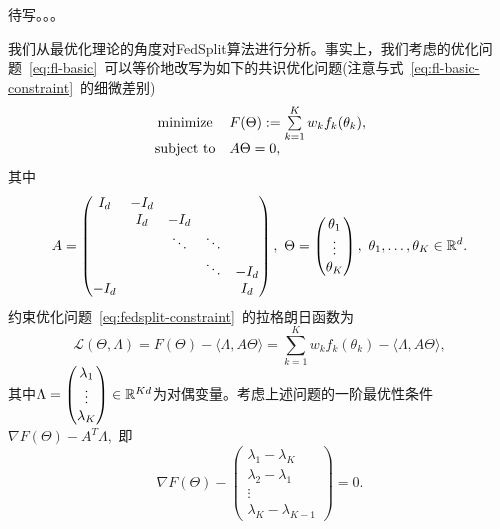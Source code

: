 待写。。。




我们从最优化理论的角度对FedSplit算法进行分析。事实上，我们考虑的优化问题~\eqref{eq:fl-basic}~可以等价地改写为如下的共识优化问题(注意与式~\eqref{eq:fl-basic-constraint}~的细微差别)
\begin{equation}
\label{eq:fedsplit-constraint}
\begin{array}{cl}
\operatorname*{minimize} & F(\Theta) := \sum\limits_{k=1}^K w_k f_k(\theta_k), \\
\text{subject to} & A \Theta = 0,
\end{array}
\end{equation}
其中
\begin{equation*}
A = \begin{pmatrix} I_d & -I_d & & & \\ & I_d & -I_d & & \\ & & \ddots & \ddots & \\ & & & \ddots & -I_d \\ -I_d & & & & I_d \end{pmatrix}, ~ \Theta = \begin{pmatrix} \theta_1 \\ \vdots \\ \theta_K \end{pmatrix}, ~ \theta_1, \ldots, \theta_K \in \mathbb{R}^d.
\end{equation*}
约束优化问题~\eqref{eq:fedsplit-constraint}~的拉格朗日函数为
\begin{equation}
\label{eq:fedsplit-lagrangian}
\mathcal{L}(\Theta, \Lambda) = F(\Theta) - \langle \Lambda, A\Theta \rangle = \sum\limits_{k=1}^K w_k f_k(\theta_k) - \langle \Lambda, A\Theta \rangle,
\end{equation}
其中$\Lambda = \begin{pmatrix} \lambda_1 \\ \vdots \\ \lambda_K \end{pmatrix} \in \mathbb{R}^{Kd}$为对偶变量。考虑上述问题的一阶最优性条件$\nabla F(\Theta) - A^T \Lambda,$ 即
\begin{equation*}
\nabla F(\Theta) - \begin{pmatrix} \lambda_1 - \lambda_K \\ \lambda_2 - \lambda_1 \\ \vdots \\ \lambda_K - \lambda_{K-1} \end{pmatrix} = 0.
\end{equation*}
